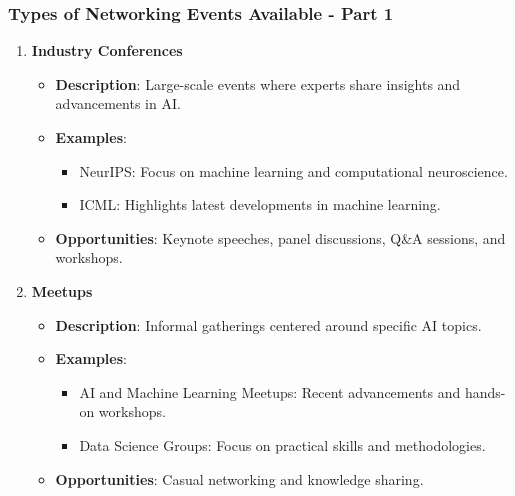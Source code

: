 \documentclass{beamer}
\begin{document}
\begin{frame}[fragile]
    \frametitle{Types of Networking Events Available - Part 1}
    \begin{enumerate}
        \item \textbf{Industry Conferences}
            \begin{itemize}
                \item \textbf{Description}: Large-scale events where experts share insights and advancements in AI.
                \item \textbf{Examples}:
                    \begin{itemize}
                        \item NeurIPS: Focus on machine learning and computational neuroscience.
                        \item ICML: Highlights latest developments in machine learning.
                    \end{itemize}
                \item \textbf{Opportunities}: Keynote speeches, panel discussions, Q\&A sessions, and workshops.
            \end{itemize}
            
        \item \textbf{Meetups}
            \begin{itemize}
                \item \textbf{Description}: Informal gatherings centered around specific AI topics.
                \item \textbf{Examples}:
                    \begin{itemize}
                        \item AI and Machine Learning Meetups: Recent advancements and hands-on workshops.
                        \item Data Science Groups: Focus on practical skills and methodologies.
                    \end{itemize}
                \item \textbf{Opportunities}: Casual networking and knowledge sharing.
            \end{itemize}
    \end{enumerate}
\end{frame}
\end{document}
